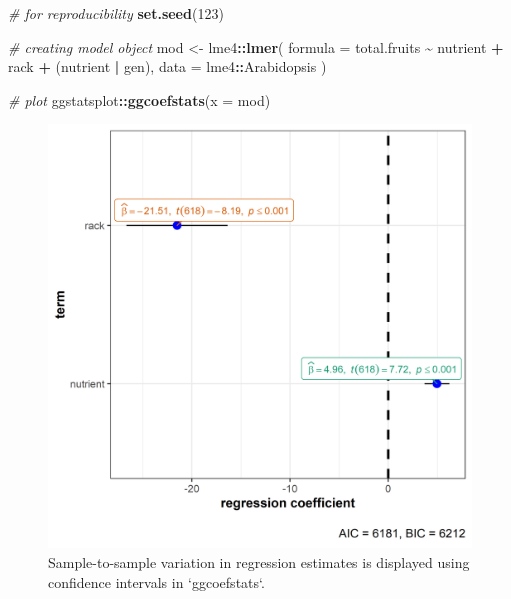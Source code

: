 \documentclass[
]{article}
\newenvironment{Shaded}{\begin{snugshade}}{\end{snugshade}}
\newcommand{\CommentTok}[1]{\textcolor[rgb]{0.56,0.35,0.01}{\textit{#1}}}
\newcommand{\DataTypeTok}[1]{\textcolor[rgb]{0.13,0.29,0.53}{#1}}
\newcommand{\DecValTok}[1]{\textcolor[rgb]{0.00,0.00,0.81}{#1}}
\newcommand{\KeywordTok}[1]{\textcolor[rgb]{0.13,0.29,0.53}{\textbf{#1}}}
\newcommand{\NormalTok}[1]{#1}
\newcommand{\OperatorTok}[1]{\textcolor[rgb]{0.81,0.36,0.00}{\textbf{#1}}}
\newcommand{\StringTok}[1]{\textcolor[rgb]{0.31,0.60,0.02}{#1}}
\begin{document}
\begin{Shaded}
\begin{Highlighting}[]
\CommentTok{\# for reproducibility}
\KeywordTok{set.seed}\NormalTok{(}\DecValTok{123}\NormalTok{)}

\CommentTok{\# creating model object}
\NormalTok{mod \textless{}{-}}\StringTok{ }\NormalTok{lme4}\OperatorTok{::}\KeywordTok{lmer}\NormalTok{(}
  \DataTypeTok{formula =}\NormalTok{ total.fruits }\OperatorTok{\textasciitilde{}}\StringTok{ }\NormalTok{nutrient }\OperatorTok{+}\StringTok{ }\NormalTok{rack }\OperatorTok{+}\StringTok{ }\NormalTok{(nutrient }\OperatorTok{|}\StringTok{ }\NormalTok{gen),}
  \DataTypeTok{data =}\NormalTok{ lme4}\OperatorTok{::}\NormalTok{Arabidopsis}
\NormalTok{)}

\CommentTok{\# plot}
\NormalTok{ggstatsplot}\OperatorTok{::}\KeywordTok{ggcoefstats}\NormalTok{(}\DataTypeTok{x =}\NormalTok{ mod)}
\end{Highlighting}
\end{Shaded}

\begin{figure}[H]
\includegraphics[width=1\linewidth]{./figures/paper-fig6-1} \caption{Sample-to-sample variation in regression estimates is displayed using confidence intervals in `ggcoefstats`.}\label{fig:fig6}
\end{figure}
\end{document}
